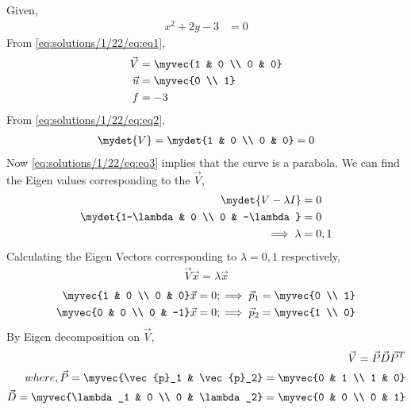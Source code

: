 Given, 
\begin{align}
	x^2 + 2y - 3 &= 0 \label{eq:solutions/1/22/eq:eq1}
\end{align}
From \eqref{eq:solutions/1/22/eq:eq1}, 
\begin{align} 
    \vec{V} &= \myvec{1 & 0 \\ 0 & 0} \label{eq:solutions/1/22/eq:eq2} \\
    \vec{u} &= \myvec{0 \\ 1} \\
    f &= -3
\end{align}
From \eqref{eq:solutions/1/22/eq:eq2},
\begin{align}
    \mydet{V} = \mydet{1 & 0 \\ 0 & 0} = 0 \label{eq:solutions/1/22/eq:eq3}
\end{align}
Now \eqref{eq:solutions/1/22/eq:eq3} implies that the curve is a parabola. We can find the Eigen values corresponding to the $\vec{V}$,
\begin{align}
    \mydet{V-\lambda I} &= 0 \nonumber \\
    \mydet{1-\lambda & 0 \\ 0 & -\lambda} &= 0 \nonumber \\
    \implies \lambda &= 0,1 \label{eq:solutions/1/22/eq:eq4}
\end{align}
Calculating the Eigen Vectors corresponding to $\lambda=0,1$ respectively,
\begin{align}
    \vec{V}\vec{x} = \lambda\vec{x} \nonumber 
\end{align}
\begin{align}
    \myvec{1 & 0 \\ 0 & 0}\vec{x} = 0;\implies \vec{p}_1 = \myvec{0 \\ 1} \label{eq:solutions/1/22/eq:eq5} \\
    \myvec{0 & 0 \\ 0 & -1}\vec{x} = 0;\implies \vec{p}_2 = \myvec{1 \\ 0} \label{eq:solutions/1/22/eq:eq6}
\end{align}
By Eigen decomposition on $\vec{V}$,
\begin{align}
    \vec{V} = \vec{P}\vec{D}\vec{P}^T \nonumber \\
    where, \vec{P} = \myvec{\vec{p}_1 & \vec{p}_2} = \myvec{0 & 1 \\ 1 & 0} \label{eq:solutions/1/22/eq:eq7} \\
    \vec{D} = \myvec{\lambda_1 & 0 \\ 0 & \lambda_2} = \myvec{0 & 0 \\ 0 & 1} \label{eq:solutions/1/22/eq:eq8}
\end{align}
